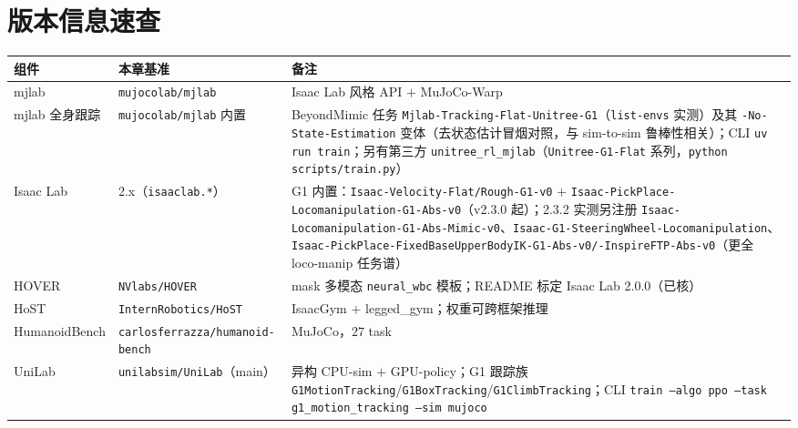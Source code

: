 \section*{版本信息速查}

\begin{center}
\small
\begin{tabular}{p{3.4cm}p{4.2cm}p{5.0cm}}
\hline
组件 & 本章基准 & 备注 \\
\hline
mjlab & \texttt{mujocolab/mjlab} & Isaac Lab 风格 API $+$ MuJoCo-Warp\cite{mjlab2026} \\
mjlab 全身跟踪 & \texttt{mujocolab/mjlab} 内置 & BeyondMimic 任务 \texttt{Mjlab-Tracking-Flat-Unitree-G1}（\texttt{list-envs} 实测）及其 \texttt{-No-State-Estimation} 变体（去状态估计冒烟对照，与 sim-to-sim 鲁棒性相关）；CLI \texttt{uv run train}；另有第三方 \texttt{unitree\_rl\_mjlab}（\texttt{Unitree-G1-Flat} 系列，\texttt{python scripts/train.py}） \\
Isaac Lab & 2.x（\texttt{isaaclab.*}） & G1 内置：\texttt{Isaac-Velocity-Flat/Rough-G1-v0} $+$ \texttt{Isaac-PickPlace-Locomanipulation-G1-Abs-v0}（v2.3.0 起）；2.3.2 实测另注册 \texttt{Isaac-Locomanipulation-G1-Abs-Mimic-v0}、\texttt{Isaac-G1-SteeringWheel-Locomanipulation}、\texttt{Isaac-PickPlace-FixedBaseUpperBodyIK-G1-Abs-v0/-InspireFTP-Abs-v0}（更全 loco-manip 任务谱） \\
HOVER & \texttt{NVlabs/HOVER} & mask 多模态 \texttt{neural\_wbc} 模板；README 标定 Isaac Lab 2.0.0（已核）\cite{he2025hover} \\
HoST & \texttt{InternRobotics/HoST} & IsaacGym $+$ legged\_gym；权重可跨框架推理\cite{huang2025host} \\
HumanoidBench & \texttt{carlosferrazza/humanoid-bench} & MuJoCo，$27$ task\cite{sferrazza2024humanoidbench} \\
UniLab & \texttt{unilabsim/UniLab}（main） & 异构 CPU-sim $+$ GPU-policy；G1 跟踪族 \texttt{G1MotionTracking}/\texttt{G1BoxTracking}/\texttt{G1ClimbTracking}；CLI \texttt{train --algo ppo --task g1\_motion\_tracking --sim mujoco}\cite{unilab2026} \\
\hline
\end{tabular}
\end{center}
